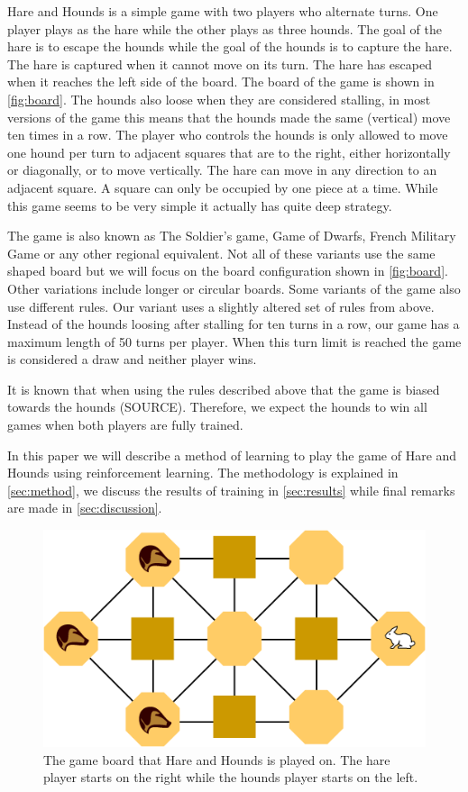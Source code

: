 Hare and Hounds is a simple game with two players who alternate turns. One
player plays as the hare while the other plays as three hounds. The goal of the
hare is to escape the hounds while the goal of the hounds is to capture the
hare. The hare is captured when it cannot move on its turn. The hare has escaped
when it reaches the left side of the board. The board of the game is shown in
\autoref{fig:board}. The hounds also loose when they are considered stalling,
in most versions of the game this means that the hounds made the same
(vertical) move ten times in a row. The player who controls the hounds is only
allowed to move one hound per turn to adjacent squares that are to the right,
either horizontally or diagonally, or to move vertically. The hare can move in
any direction to an adjacent square. A square can only be occupied by one piece
at a time. While this game seems to be very simple it actually has quite deep
strategy.

The game is also known as The Soldier's game, Game of Dwarfs, French Military
Game or any other regional equivalent. Not all of these variants use the same
shaped board but we will focus on the board configuration shown in
\autoref{fig:board}. Other variations include longer or circular boards.
Some variants of the game also use different rules. Our variant uses a slightly
altered set of rules from above. Instead of the hounds loosing after stalling
for ten turns in a row, our game has a maximum length of 50 turns per player.
When this turn limit is reached the game is considered a draw and neither
player wins.

It is known that when using the rules described above that the game is biased
towards the hounds (SOURCE). Therefore, we expect the hounds to win all games
when  both players are fully trained. 

In this paper we will describe a method of learning to play the game of Hare
and Hounds using reinforcement learning. The methodology is explained in
\autoref{sec:method}, we discuss the results of training in
\autoref{sec:results} while final remarks are made in \autoref{sec:discussion}.

\begin{figure}[h]
	\centering
	\includegraphics[width=.75\textwidth]{Hare_and_Hounds_board.png}
	\caption{The game board that Hare and Hounds is played on. The hare player
		starts on the right while the hounds player starts on the left.}
	\label{fig:board}
\end{figure}
